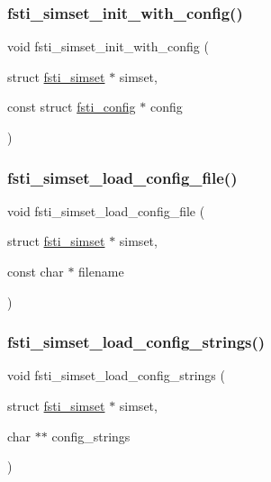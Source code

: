 \subsubsection{\texorpdfstring{fsti\+\_\+simset\+\_\+init\+\_\+with\+\_\+config()}{fsti\_simset\_init\_with\_config()}}
{\footnotesize\ttfamily void fsti\+\_\+simset\+\_\+init\+\_\+with\+\_\+config (\begin{DoxyParamCaption}\item[{struct \mbox{\hyperlink{structfsti__simset}{fsti\+\_\+simset}} $\ast$}]{simset,  }\item[{const struct \mbox{\hyperlink{structfsti__config}{fsti\+\_\+config}} $\ast$}]{config }\end{DoxyParamCaption})}

\mbox{\label{fsti-simset_8c_a8635ad080108f9d35e1e0f01d9e7c855}} 
\subsubsection{\texorpdfstring{fsti\+\_\+simset\+\_\+load\+\_\+config\+\_\+file()}{fsti\_simset\_load\_config\_file()}}
{\footnotesize\ttfamily void fsti\+\_\+simset\+\_\+load\+\_\+config\+\_\+file (\begin{DoxyParamCaption}\item[{struct \mbox{\hyperlink{structfsti__simset}{fsti\+\_\+simset}} $\ast$}]{simset,  }\item[{const char $\ast$}]{filename }\end{DoxyParamCaption})}

\mbox{\label{fsti-simset_8c_ab81c9af7043163aa922dd03128d18f91}} 
\subsubsection{\texorpdfstring{fsti\+\_\+simset\+\_\+load\+\_\+config\+\_\+strings()}{fsti\_simset\_load\_config\_strings()}}
{\footnotesize\ttfamily void fsti\+\_\+simset\+\_\+load\+\_\+config\+\_\+strings (\begin{DoxyParamCaption}\item[{struct \mbox{\hyperlink{structfsti__simset}{fsti\+\_\+simset}} $\ast$}]{simset,  }\item[{char $\ast$$\ast$}]{config\+\_\+strings }\end{DoxyParamCaption})}

